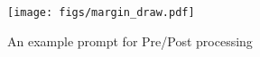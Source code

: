 \begin{figure}[h!]
    \centering
    \texttt{[image: figs/margin\_draw.pdf]}
    \caption{An example prompt 
    for Pre/Post processing
    }
    \label{fig:preproprocessing}
    \vspace{-10pt}
\end{figure}